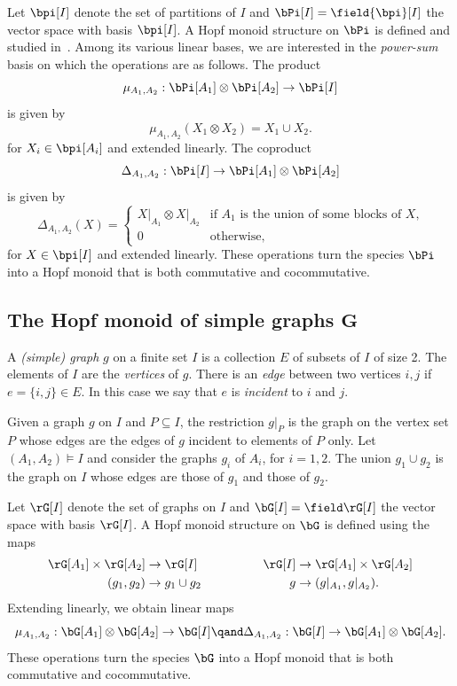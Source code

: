 Let ${\bpi}[I]$ denote the set of partitions of $I$ and $\bPi[I]=\field {\bpi}[I]$ the vector
space with basis ${\bpi}[I]$. 
A Hopf monoid structure on $\bPi$ is defined and studied in~\cite{AguiarBergeronThiem,AM:2010,BakerJarvisBergeronThiem,BergeronZabrocki}. Among its various linear bases, we are interested in the \emph{power-sum} basis 
on which the operations are as follows. 
The product
\[
\mu_{A_1,A_2}: \bPi[A_1] \otimes \bPi[A_2] \to \bPi[I] 
\]
is given by
\begin{equation}\label{e:prod-m}
\mu_{A_1,A_2}({X_1} \otimes {X_2}) = X_1\cup X_2.
\end{equation}
for $X_i\in {\bpi}[A_i]$ and extended linearly. The coproduct
\[
\Delta_{A_1,A_2}: \bPi[I] \to \bPi[A_1]\otimes\bPi[A_2]
\]
is given by
\begin{equation}\label{e:coprod-m}
\Delta_{A_1,A_2}(X) = 
\begin{cases}
{X|_{A_1}} \otimes {X|_{A_2}} & \text{if $A_1$ is the union of some blocks of $X$,} \\
0 & \text{otherwise,}
\end{cases}
\end{equation}
for $X\in {\bpi}[I]$ and extended linearly.
These operations turn the species $\bPi$ into a Hopf monoid that is both commutative and cocommutative.

\subsection{The Hopf monoid of simple graphs \texorpdfstring{$\mathbf{G}$}{G}}\label{ss:graph}

A \emph{(simple) graph} $g$ on a finite set $I$ is a collection $E$ of subsets of $I$ of size 2.
The elements of $I$ are the \emph{vertices} of $g$.
There is an \emph{edge} between two vertices $i, j$ if $e=\{i,j\}\in E$. In this case we say that $e$ is \emph{incident} to $i$ and $j$.


 Given a graph $g$ on $I$ and $P\subseteq I$, the restriction
$g|_P$ is the graph on the vertex set $P$ whose edges are the edges of $g$ incident to elements of $P$ only.
Let $(A_1, A_2)\models I$ and
consider the graphs $g_i$ of $A_i$, for $i=1,2$.
The union $g_1\cup g_2$ is the graph on $I$ 
whose edges are those of $g_1$ and those of $g_2$.

Let $\rG[I]$ denote the set of graphs on $I$ and $\bG[I]=\field \rG[I]$ the vector
space with basis $\rG[I]$. 
A Hopf monoid structure on $\bG$ is defined using the maps
\begin{equation}\label{e:G}
\begin{aligned}
\rG[A_1]\times\rG[A_2] & \to \rG[I] &\qquad\qquad \rG[I] & \to \rG[A_1]\times\rG[A_2]\\
(g_1,g_2) & \to g_1\cup g_2
& g & \to (g |_{A_1},g |_{A_2}).
\end{aligned}
\end{equation}
Extending linearly, we obtain linear maps
\[
 \mu_{A_1,A_2}:\bG[A_1]\otimes\bG[A_2] \to \bG[I]
 \qand
\Delta_{A_1,A_2}:\bG[I]\to \bG[A_1]\otimes\bG[A_2].
\]
These operations turn the species $\bG$ into a Hopf monoid that is both commutative and cocommutative.

